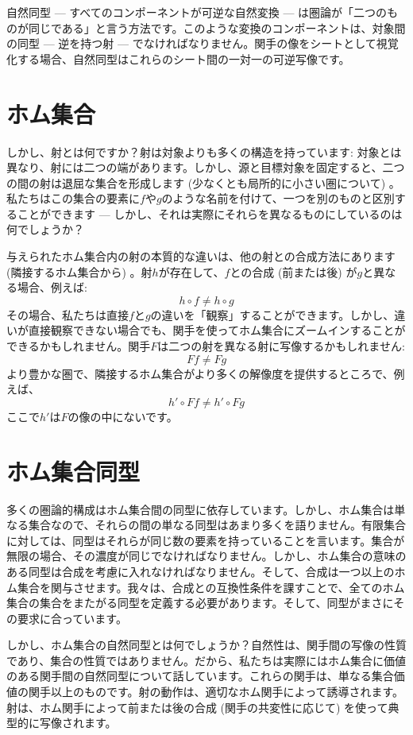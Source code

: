 自然同型 --- すべてのコンポーネントが可逆な自然変換 --- は圏論が「二つのものが同じである」と言う方法です。このような変換のコンポーネントは、対象間の同型 --- 逆を持つ射 --- でなければなりません。関手の像をシートとして視覚化する場合、自然同型はこれらのシート間の一対一の可逆写像です。

\section{ホム集合}

しかし、射とは何ですか？射は対象よりも多くの構造を持っています: 対象とは異なり、射には二つの端があります。しかし、源と目標対象を固定すると、二つの間の射は退屈な集合を形成します (少なくとも局所的に小さい圏について) 。私たちはこの集合の要素に$f$や$g$のような名前を付けて、一つを別のものと区別することができます --- しかし、それは実際にそれらを異なるものにしているのは何でしょうか？

与えられたホム集合内の射の本質的な違いは、他の射との合成方法にあります (隣接するホム集合から) 。射$h$が存在して、$f$との合成 (前または後) が$g$と異なる場合、例えば: 
\[h \circ f \neq h \circ g\]
その場合、私たちは直接$f$と$g$の違いを「観察」することができます。しかし、違いが直接観察できない場合でも、関手を使ってホム集合にズームインすることができるかもしれません。関手$F$は二つの射を異なる射に写像するかもしれません: 
\[F f \neq F g\]
より豊かな圏で、隣接するホム集合がより多くの解像度を提供するところで、例えば、
\[h' \circ F f \neq h' \circ F g\]
ここで$h'$は$F$の像の中にないです。

\section{ホム集合同型}

多くの圏論的構成はホム集合間の同型に依存しています。しかし、ホム集合は単なる集合なので、それらの間の単なる同型はあまり多くを語りません。有限集合に対しては、同型はそれらが同じ数の要素を持っていることを言います。集合が無限の場合、その濃度が同じでなければなりません。しかし、ホム集合の意味のある同型は合成を考慮に入れなければなりません。そして、合成は一つ以上のホム集合を関与させます。我々は、合成との互換性条件を課すことで、全てのホム集合の集合をまたがる同型を定義する必要があります。そして、同型がまさにその要求に合っています。

しかし、ホム集合の自然同型とは何でしょうか？自然性は、関手間の写像の性質であり、集合の性質ではありません。だから、私たちは実際にはホム集合に価値のある関手間の自然同型について話しています。これらの関手は、単なる集合価値の関手以上のものです。射の動作は、適切なホム関手によって誘導されます。射は、ホム関手によって前または後の合成 (関手の共変性に応じて) を使って典型的に写像されます。

